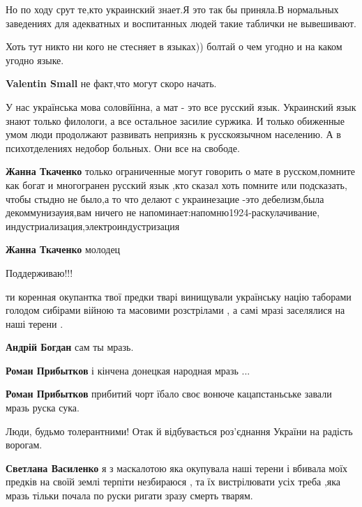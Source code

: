 \begin{itemize}
Но по ходу срут те,кто украинский знает.Я это так бы приняла.В нормальных заведениях для адекватных и воспитанных людей такие таблички не вывешивают.

Хоть тут никто ни кого не стесняет в языках)) болтай о чем угодно и на каком угодно языке.\Smiley[1.0][yellow]

\textbf{Valentin Small} не факт,что могут скоро начать.


У нас українська мова соловйїнна, а мат - это все русский язык. Украинский язык
знают только филологи, а все остальное засилие суржика. И только обиженные умом
люди продолжают развивать неприязнь к русскоязычном населению. А в
психотделениях недобор больных. Они все на свободе.

\begin{itemize}
\textbf{Жанна Ткаченко} только ограниченные могут говорить о мате в русском,помните как богат и многогранен русский язык ,кто сказал хоть помните или подсказать, чтобы стыдно не было,а то что делают с украинезацие -это дебелизм,была декоммунизауия,вам ничего не напоминает:напомню1924-раскулачивание, индустриализация,электроиндустризация

\textbf{Жанна Ткаченко} молодец
\end{itemize}

Поддерживаю!!!

ти коренная окупантка твої предки тварі винищували українську націю таборами
голодом сибірами війною та масовими розстрілами , а самі мразі заселялися на
наші терени .

\begin{itemize}

\textbf{Андрій Богдан} сам ты мразь.

\textbf{Роман Прибытков} і кінчена донецкая народная мразь ...\Laughey[1.0][white]

\textbf{Роман Прибытков} прибитий чорт їбало своє вонюче кацапстаньське завали мразь руска сука.

Люди, будьмо толерантними! Отак й відбувається роз'єднання України на радість ворогам.

\textbf{Светлана Василенко} я з маскалотою яка окупувала наші терени і вбивала моїх предків на своїй землі терпіти незбираюся , та їх вистрілювати усіх треба ,яка мразь тільки почала по руски ригати зразу смерть тварям.


\end{itemize}
\end{itemize}
